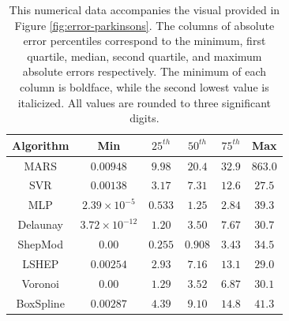 \documentclass[smallextended,final]{svjour3}       %
\begin{document}
\begin{appendix}
\begin{table}
  \centering
  \begin{tabular}{c|c|c|c|c|c}
    \hline
    Algorithm & Min & $25^{th}$ & $50^{th}$ & $75^{th}$ & Max\\
    \hline
    MARS & $0.00948$ & $9.98$ & $20.4$ & $32.9$ & $863.0$\\
    SVR & $0.00138$ & $3.17$ & $7.31$ & $12.6$ & $\mathbf{27.5}$\\
    MLP & $2.39 \times 10^{-5}$ & $\mathit{0.533}$ & $\mathit{1.25}$ & $\mathbf{2.84}$ & $39.3$\\
    Delaunay & $\mathit{3.72 \times 10^{-12}}$ & $1.20$ & $3.50$ & $7.67$ & $30.7$\\
    ShepMod & $\mathbf{0.00}$ & $\mathbf{0.255}$ & $\mathbf{0.908}$ & $\mathit{3.43}$ & $34.5$\\
    LSHEP & $0.00254$ & $2.93$ & $7.16$ & $13.1$ & $\mathit{29.0}$\\
    Voronoi & $\mathbf{0.00}$ & $1.29$ & $3.52$ & $6.87$ & $30.1$\\
    BoxSpline & $0.00287$ & $4.39$ & $9.10$ & $14.8$ & $41.3$\\
    \hline
  \end{tabular}
  \caption{This numerical data accompanies the visual provided in
    Figure \ref{fig:error-parkinsons}. The columns of absolute error
    percentiles correspond to the minimum, first quartile, median,
    second quartile, and maximum absolute errors respectively. The
    minimum of each column is boldface, while the second lowest value
    is italicized. All values are rounded to three significant
    digits.}
  \label{table:error-parkinsons}
\end{table}


\end{appendix}
\end{document}
